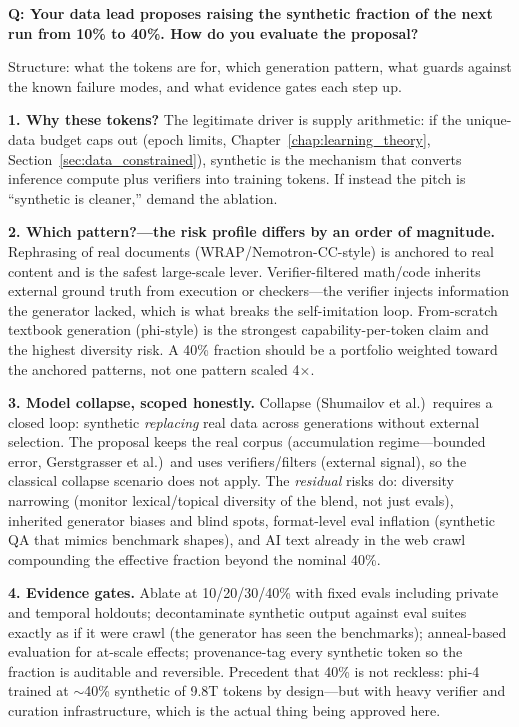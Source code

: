 \begin{interviewq}
\textbf{Q: Your data lead proposes raising the synthetic fraction of the next run from 10\% to 40\%. How do you evaluate the proposal?}

 \quad {} \quad \badgefreq{\freqhigh}

\stronganswer
Structure: what the tokens are for, which generation pattern, what guards against the known failure modes, and what evidence gates each step up.

\textbf{1. Why these tokens?} The legitimate driver is supply arithmetic: if the unique-data budget caps out (epoch limits, Chapter~\ref{chap:learning_theory}, Section~\ref{sec:data_constrained}), synthetic is the mechanism that converts inference compute plus verifiers into training tokens. If instead the pitch is ``synthetic is cleaner,'' demand the ablation.

\textbf{2. Which pattern?---the risk profile differs by an order of magnitude.} Rephrasing of real documents (WRAP/Nemotron-CC-style) is anchored to real content and is the safest large-scale lever. Verifier-filtered math/code inherits external ground truth from execution or checkers---the verifier injects information the generator lacked, which is what breaks the self-imitation loop. From-scratch textbook generation (phi-style) is the strongest capability-per-token claim and the highest diversity risk. A 40\% fraction should be a portfolio weighted toward the anchored patterns, not one pattern scaled 4$\times$.

\textbf{3. Model collapse, scoped honestly.} Collapse (Shumailov et al.)\ requires a closed loop: synthetic \textit{replacing} real data across generations without external selection. The proposal keeps the real corpus (accumulation regime---bounded error, Gerstgrasser et al.)\ and uses verifiers/filters (external signal), so the classical collapse scenario does not apply. The \textit{residual} risks do: diversity narrowing (monitor lexical/topical diversity of the blend, not just evals), inherited generator biases and blind spots, format-level eval inflation (synthetic QA that mimics benchmark shapes), and AI text already in the web crawl compounding the effective fraction beyond the nominal 40\%.

\textbf{4. Evidence gates.} Ablate at 10/20/30/40\% with fixed evals including private and temporal holdouts; decontaminate synthetic output against eval suites exactly as if it were crawl (the generator has seen the benchmarks); anneal-based evaluation for at-scale effects; provenance-tag every synthetic token so the fraction is auditable and reversible. Precedent that 40\% is not reckless: phi-4 trained at $\sim$40\% synthetic of 9.8T tokens by design---but with heavy verifier and curation infrastructure, which is the actual thing being approved here.


\end{interviewq}
